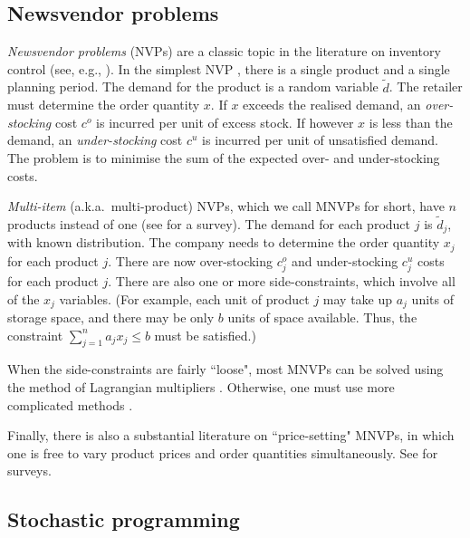 \documentclass[a4paper,11pt]{article}
\begin{document}
\subsection{Newsvendor problems} \label{sub:lit1}

\emph{Newsvendor problems} (NVPs) are a classic topic in the literature on inventory control (see, e.g., \cite{Ch12,Po02,Zi00}). In the simplest NVP \cite{HW63}, there is a single product and a single planning period. The demand for the product is a random variable $\tilde d$. The retailer must determine the order quantity $x$. If $x$ exceeds the realised demand, an \emph{over-stocking} cost $c^o$ is incurred per unit of excess stock. If however $x$ is less than the demand, an \emph{under-stocking} cost $c^u$ is incurred per unit of unsatisfied demand. The problem is to minimise the sum of the expected over- and under-stocking costs.

\emph{Multi-item} (a.k.a.\ multi-product) NVPs, which we call MNVPs for short, have $n$ products instead of one (see \cite{Tu12} for a survey). The demand for each product $j$ is $\tilde d_j$, with known distribution. The company needs to determine the order quantity $x_j$ for each product $j$. There are now over-stocking $c^o_j$ and under-stocking $c^u_j$ costs for each product $j$. There are also one or more side-constraints, which involve all of the $x_j$ variables. (For example, each unit of product $j$ may take up $a_j$ units of storage space, and there may be only $b$ units of space available. Thus, the constraint $\sum_{j=1}^n a_j x_j \le b$ must be satisfied.)

When the side-constraints are fairly ``loose", most MNVPs can be solved using the method of Lagrangian multipliers \cite{BR93,HW63}. Otherwise, one must use more complicated methods \cite{AM05,LL95,ZXH09}. 

Finally, there is also a substantial literature on ``price-setting" MNVPs, in which one is free to vary product prices and order quantities simultaneously. See \cite{De20,PD99} for surveys.

\subsection{Stochastic programming} \label{sub:lit2}
\end{document}
